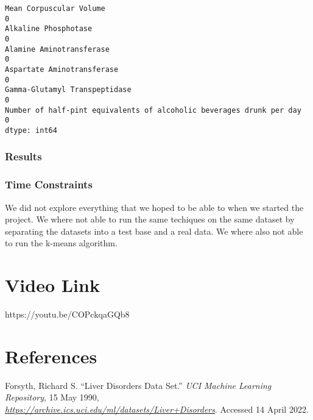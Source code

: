 \documentclass[11pt]{article}
\makeatletter
\newcommand{\boxspacing}{\kern\kvtcb@left@rule\kern\kvtcb@boxsep}
\newcommand{\prompt}[4]{
        {\ttfamily\llap{{\color{#2}[#3]:\hspace{3pt}#4}}\vspace{-\baselineskip}}
    }
\makeatother
\begin{document}
            \begin{tcolorbox}[breakable, size=fbox, boxrule=.5pt, pad at break*=1mm, opacityfill=0]
\prompt{Out}{outcolor}{33}{\boxspacing}
\begin{Verbatim}[commandchars=\\\{\}]
Mean Corpuscular Volume                                                 0
Alkaline Phosphotase                                                    0
Alamine Aminotransferase                                                0
Aspartate Aminotransferase                                              0
Gamma-Glutamyl Transpeptidase                                           0
Number of half-pint equivalents of alcoholic beverages drunk per day    0
dtype: int64
\end{Verbatim}
\end{tcolorbox}
        
    \hypertarget{results}{%
\subsubsection*{Results}\label{results}}

    \hypertarget{time-constraints}{%
\subsubsection*{Time Constraints}\label{time-constraints}}

    We did not explore everything that we hoped to be able to when we
started the project. We where not able to run the same techiques on the
same dataset by separating the datasets into a test base and a real
data. We where also not able to run the k-means algorithm.

    \hypertarget{video-link}{%
\section*{Video Link}\label{video-link}}

    https://youtu.be/COPckqaGQb8

    \hypertarget{references}{%
\section*{References}\label{references}}

    Forsyth, Richard S. ``Liver Disorders Data Set.'' \emph{UCI Machine
Learning Repository}, 15 May 1990,
\href{https://archive.ics.uci.edu/ml/datasets/Liver+Disorders}{\emph{https://archive.ics.uci.edu/ml/datasets/Liver+Disorders}}.
Accessed 14 April 2022.


    
    
    
\end{document}
